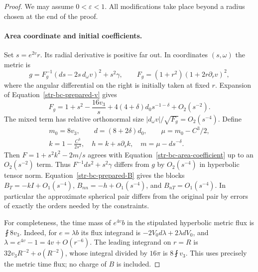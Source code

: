 \begin{proof}
We may assume $0<\varepsilon<1$. All modifications take place beyond a radius
chosen at the end of the proof.

\paragraph{Area coordinate and initial coefficients.}
Set $s=e^{2v}r$. Its radial derivative is positive far out. In coordinates
$(s,\omega)$ the metric is
\[
 g=F_g^{-1}(ds-2s\,d_\omega v)^2+s^2\gamma,
 \qquad F_g=(1+r^2)(1+2r\partial_rv)^2,
\]
where the angular differential on the right is initially taken at fixed $r$.
Expansion of Equation~\eqref{str-bc-prepared-v} gives
\begin{equation}
 F_g=1+s^2-\frac{16v_3}{s}
       +4(4+\delta)d_0s^{-1-\delta}+O_2(s^{-2}).
 \label{str-bc-area-coefficient}
\end{equation}
The mixed term has relative orthonormal size
$|d_\omega v|/\sqrt{F_g}=O_2(s^{-4})$. Define
\begin{equation}
 \begin{gathered}
 m_0=8v_3,\qquad d=(8+2\delta)d_0,\qquad
 \mu=m_0-C^3/2,\\
 k=1-\frac{C^3}{2s^3},\quad h=k+s\partial_sk,
 \quad m=\mu-ds^{-\delta}.
 \end{gathered}
 \label{str-bc-initial-coefficients}
\end{equation}
Then $F=1+s^2k^2-2m/s$ agrees with
Equation~\eqref{str-bc-area-coefficient} up to an $O_2(s^{-2})$ term.
Thus $F^{-1}ds^2+s^2\gamma$ differs from $g$ by $O_2(s^{-4})$ in
hyperbolic tensor norm. Equation~\eqref{str-bc-prepared-B} gives the blocks
$B_T=-kI+O_1(s^{-4})$, $B_{nn}=-h+O_1(s^{-4})$,
and $B_{nT}=O_1(s^{-4})$. In particular the approximate spherical pair
differs from the original pair by errors of exactly the orders needed by
the constraints.

For completeness, the time mass of $e^{4v}b$ in the stipulated hyperbolic
metric flux is $\fint 8v_3$. Indeed, for $e=\lambda b$ its flux integrand
is $-2V_0d\lambda+2\lambda dV_0$, and
$\lambda=e^{4v}-1=4v+O(r^{-6})$. The leading integrand on $r=R$ is
$32v_3R^{-2}+o(R^{-2})$, whose integral divided by $16\pi$ is
$8\fint v_3$. This uses precisely the metric time flux; no charge of $B$
is included.


\end{proof}
